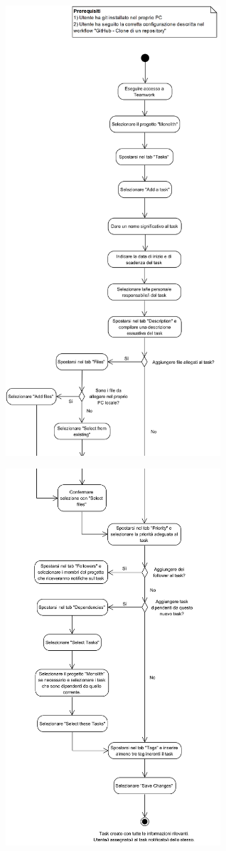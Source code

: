 \begin{center}
	\includegraphics[width=8cm]{../../documenti/NormeDiProgetto/DiagrammiProcedure/CreazioneTask1.png}
\end{center}

\begin{center}
	\includegraphics[width=8cm]{../../documenti/NormeDiProgetto/DiagrammiProcedure/CreazioneTask2.png}
\end{center}


